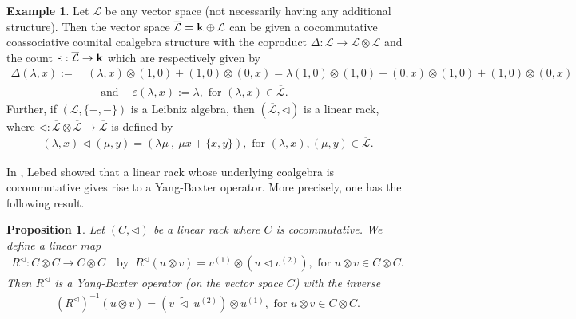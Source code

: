 \documentclass[a4paper,reqno,10pt]{amsart}
\theoremstyle{plain}
\newtheorem{prop}[thm]{Proposition}
\theoremstyle{definition}
\newtheorem{exam}[thm]{Example}
\theoremstyle{remark}
\begin{document}
\begin{exam}\label{last-examm}\cite{lebed} Let $\mathcal{L}$ be any vector space (not necessarily having any additional structure). Then the vector space $\overline{\mathcal{L}} = {\bf k} \oplus \mathcal{L}$ can be given a cocommutative coassociative counital coalgebra structure with the coproduct $\Delta: \overline{\mathcal{L}} \rightarrow \overline{\mathcal{L}} \otimes \overline{\mathcal{L}}$ and the count $\varepsilon: \overline{\mathcal{L}} \rightarrow {\bf k}$ which are respectively given by 
\begin{align*}
    \Delta ( \lambda , x) :=~& (\lambda , x) \otimes (1 , 0) + (1 , 0) \otimes (0, x) = \lambda (1, 0) \otimes (1, 0) + (0, x) \otimes (1, 0) + (1, 0) \otimes (0, x) \\
    & ~~~~ \text{ and } ~~~~ \varepsilon (\lambda, x) := \lambda, \text{ for } (\lambda, x) \in \overline{\mathcal{L}}.
\end{align*}
Further, if $(\mathcal{L}, \{ - , - \})$ is a Leibniz algebra, then $(\overline{ \mathcal{L}}, \triangleleft)$ is a linear rack, where $\triangleleft : \overline{ \mathcal{L}} \otimes \overline{ \mathcal{L}} \rightarrow \overline{ \mathcal{L}}$ is defined by
\begin{align*}
    (\lambda, x) \triangleleft (\mu, y) = (\lambda \mu ~\! , ~\! \mu x + \{ x, y \}), \text{ for } (\lambda, x), (\mu, y) \in \overline{ \mathcal{L}}.
\end{align*}
\end{exam}

\medskip

In \cite{lebed}, Lebed showed that a linear rack whose underlying coalgebra is cocommutative gives rise to a Yang-Baxter operator. More precisely, one has the following result.

\begin{prop}\label{lebed-prop}   Let $(C, \triangleleft)$ be a linear rack where $C$ is cocommutative. We define a linear map
\begin{align*}
  R^\triangleleft : C \otimes C \rightarrow C \otimes C ~~~ \text{ by } ~  R^\triangleleft (u \otimes v) = v^{(1)} \otimes (u \triangleleft v^{(2)}), \text{ for } u \otimes v \in C \otimes C.
\end{align*}
    Then $R^\triangleleft$ is a Yang-Baxter operator (on the vector space $C$) with the inverse 
    \begin{align*}
        (R^\triangleleft)^{-1} (u \otimes v) = (v ~ \! \widetilde{\triangleleft} ~ \!  u^{(2)}) \otimes u^{(1)}, \text{ for }  u \otimes v \in C \otimes C.
    \end{align*}
\end{prop}
\end{document}
